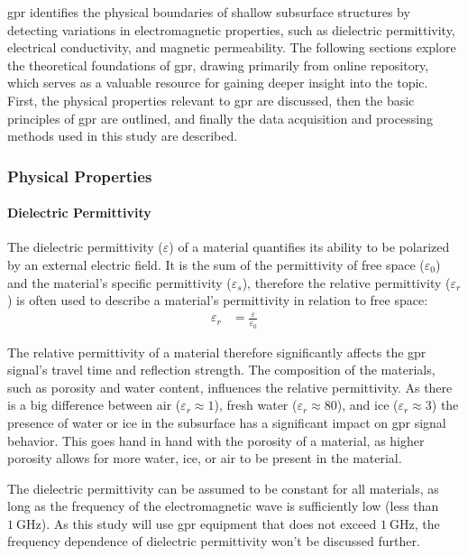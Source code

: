 \gls{gpr} identifies the physical boundaries of shallow subsurface structures by detecting variations in electromagnetic properties, such as dielectric permittivity, electrical conductivity, and magnetic permeability. 
The following sections explore the theoretical foundations of \gls{gpr}, drawing primarily from \citet{geoscidevelopersGroundPenetratingRadar2017} online repository, which serves as a valuable resource for gaining deeper insight into the topic.
First, the physical properties relevant to \gls{gpr} are discussed, then the basic principles of \gls{gpr} are outlined, and finally the data acquisition and processing methods used in this study are described.    
\subsubsection{Physical Properties}
\paragraph{Dielectric Permittivity} 
The dielectric permittivity (\(\varepsilon\)) of a material quantifies its ability to be polarized by an external electric field. 
It is the sum of the permittivity of free space (\(\varepsilon_0\)) and the material's specific permittivity (\(\varepsilon_s\)), 
therefore the relative permittivity (\(\varepsilon_r\)) is often used to describe a material's permittivity in relation to free space:
\begin{align}
    \varepsilon_r &= \frac{\varepsilon}{\varepsilon_0}\label{al:varepsilon}
\end{align}

The relative permittivity of a material therefore significantly affects the \gls{gpr} signal's travel time and reflection strength. 
The composition of the materials, such as porosity and water content, influences the relative permittivity. 
As there is a big difference between air (\(\varepsilon_r \approx 1\)), fresh water (\(\varepsilon_r \approx 80\)), and ice (\(\varepsilon_r \approx 3\)) the presence of water or ice in the subsurface has a significant impact on \gls{gpr} signal behavior.
This goes hand in hand with the porosity of a material, as higher porosity allows for more water, ice, or air to be present in the material. 

The dielectric permittivity can be assumed to be constant for all materials, as long as the frequency of the electromagnetic wave is sufficiently low (less than \(\SI{1}{\giga\hertz}\)). 
As this study will use \gls{gpr} equipment that does not exceed \(\SI{1}{\giga\hertz}\), the frequency dependence of dielectric permittivity won't be discussed further.

